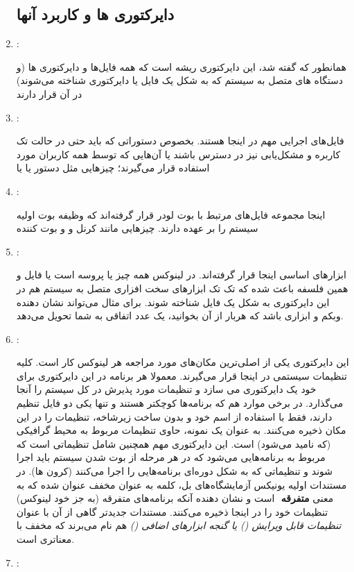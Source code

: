 \begin{enumerate}
\subsection*{دایرکتوری ها و کاربرد آنها}
\item {\large\lr{\textbf{\bidihl{/}}}}:

همانطور که گفته شد، این دایرکتوری ریشه است که همه فایل‌ها و دایرکتوری ها (و دستگاه های متصل به سیستم که به شکل یک فایل یا دایرکتوری شناخته می‌شوند) در آن قرار دارند
\item {\large{}}:

فایل‌های اجرایی مهم در اینجا هستند. بخصوص دستوراتی که باید حتی در حالت تک کاربره و مشکل‌یابی نیز در دسترس باشند یا آن‌هایی که توسط همه کاربران مورد استفاده قرار می‌گیرند؛ چیزهایی مثل دستور 
 یا
 یا

\item {\large{}}:

اینجا مجموعه فایل‌های مرتبط با بوت لودر قرار گرفته‌اند که وظیفه بوت اولیه سیستم را بر عهده دارند. چیزهایی مانند کرنل و 
 و بوت کننده 

\item {\large{}}:

ابزارهای اساسی اینجا قرار گرفته‌اند. در لینوکس همه چیز یا پروسه است یا فایل و همین فلسفه باعث شده که تک تک ابزارهای سخت افزاری متصل به سیستم هم در این دایرکتوری به شکل یک فایل شناخته شوند. برای مثال 
 می‌تواند نشان دهنده وبکم و 
 ابزاری باشد که هربار از آن بخوانید، یک عدد اتفاقی به شما تحویل می‌دهد.
\item {\large{}}:

این دایرکتوری یکی از اصلی‌ترین مکان‌های مورد مراجعه هر لینوکس کار است. کلیه تنظیمات سیستمی در اینجا قرار می‌گیرند. معمولا هر برنامه در این دایرکتوری برای خود یک دایرکتوری می سازد و تنظیمات مورد پذیرش در کل سیستم را آنجا می‌گذارد. در برخی موارد هم که برنامه‌ها کوچکتر هستند و تنها یکی دو فایل تنظیم دارند، فقط با استفاده از اسم خود و بدون ساخت زیرشاخه‌، تنظیمات را در این مکان ذخیره می‌کنند. به عنوان یک نمونه، 
 حاوی تنظیمات مربوط به محیط گرافیکی (که 
 نامید می‌شود) است.
این دایرکتوری مهم همچنین شامل تنظیماتی است که مربوط به برنامه‌هایی می‌شود که در هر مرحله از بوت شدن سیستم باید اجرا شوند و تنظیماتی که به شکل دوره‌ای برنامه‌هایی را اجرا می‌کنند (کرون‌ ها).
در مستندات اولیه یونیکس آزمایشگاه‌های بل، کلمه 
 به عنوان مخفف 
 عنوان شده که به معنی
\textbf{متفرقه}
‌ است و نشان دهنده آنکه برنامه‌های متفرقه (به جز خود لینوکس) تنظیمات خود را در اینجا ذخیره می‌کنند. مستندات جدیدتر گاهی از آن با عنوان
\emph{تنظیمات قابل ویرایش () یا گنجه ابزارهای اضافی ()}
هم نام می‌برند که مخفف با معناتری است.
\item {\large{}}:


\end{enumerate}

